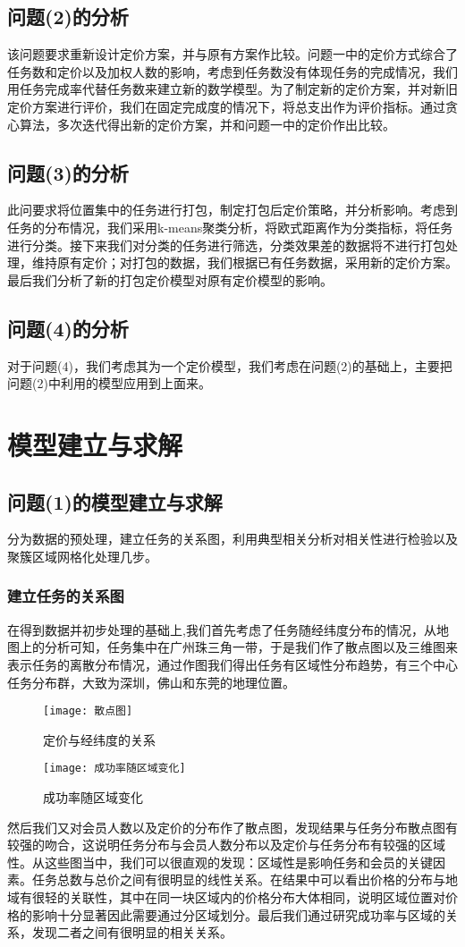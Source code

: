 \documentclass{ctexart}
\begin{document}
\subsection{问题(2)的分析}
该问题要求重新设计定价方案，并与原有方案作比较。问题一中的定价方式综合了任务数和定价以及加权人数的影响，考虑到任务数没有体现任务的完成情况，我们用任务完成率代替任务数来建立新的数学模型。为了制定新的定价方案，并对新旧定价方案进行评价，我们在固定完成度的情况下，将总支出作为评价指标。通过贪心算法，多次迭代得出新的定价方案，并和问题一中的定价作出比较。
\subsection{问题(3)的分析}
此问要求将位置集中的任务进行打包，制定打包后定价策略，并分析影响。考虑到任务的分布情况，我们采用k-means聚类分析，将欧式距离作为分类指标，将任务进行分类。接下来我们对分类的任务进行筛选，分类效果差的数据将不进行打包处理，维持原有定价；对打包的数据，我们根据已有任务数据，采用新的定价方案。最后我们分析了新的打包定价模型对原有定价模型的影响。
\subsection{问题(4)的分析}
对于问题(4)，我们考虑其为一个定价模型，我们考虑在问题(2)的基础上，主要把问题(2)中利用的模型应用到上面来。




\section{模型建立与求解}
\subsection{问题(1)的模型建立与求解}
分为数据的预处理，建立任务的关系图，利用典型相关分析对相关性进行检验以及聚簇区域网格化处理几步。
\subsubsection{建立任务的关系图}
在得到数据并初步处理的基础上,我们首先考虑了任务随经纬度分布的情况，从地图上的分析可知，任务集中在广州珠三角一带，于是我们作了散点图以及三维图来表示任务的离散分布情况，通过作图我们得出任务有区域性分布趋势，有三个中心任务分布群，大致为深圳，佛山和东莞的地理位置。
\begin{figure}[htbp] 
\centering
\texttt{[image: 散点图]} 
\caption{定价与经纬度的关系}
\end{figure}
\begin{figure}[htbp] 
\centering
\texttt{[image: 成功率随区域变化]} 
\caption{成功率随区域变化}
\end{figure}
\newpage
然后我们又对会员人数以及定价的分布作了散点图，发现结果与任务分布散点图有较强的吻合，这说明任务分布与会员人数分布以及定价与任务分布有较强的区域性。从这些图当中，我们可以很直观的发现：区域性是影响任务和会员的关键因素。任务总数与总价之间有很明显的线性关系。在结果中可以看出价格的分布与地域有很轻的关联性，其中在同一块区域内的价格分布大体相同，说明区域位置对价格的影响十分显著因此需要通过分区域划分。最后我们通过研究成功率与区域的关系，发现二者之间有很明显的相关关系。
\end{document}

